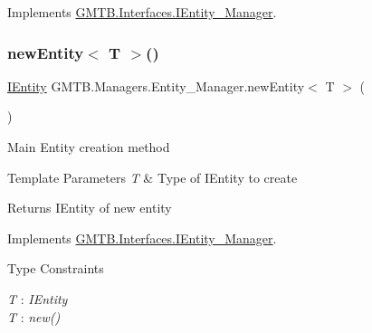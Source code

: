 Implements \mbox{\hyperlink{interface_g_m_t_b_1_1_interfaces_1_1_i_entity___manager}{G\+M\+T\+B.\+Interfaces.\+I\+Entity\+\_\+\+Manager}}.

\mbox{\label{class_g_m_t_b_1_1_managers_1_1_entity___manager_a996b960a3e3755a9e2a90501aa961715}} 
\subsubsection{\texorpdfstring{newEntity$<$ T $>$()}{newEntity< T >()}\hspace{0.1cm}{\footnotesize\ttfamily [1/5]}}
{\footnotesize\ttfamily \mbox{\hyperlink{interface_g_m_t_b_1_1_interfaces_1_1_i_entity}{I\+Entity}} G\+M\+T\+B.\+Managers.\+Entity\+\_\+\+Manager.\+new\+Entity$<$ T $>$ (\begin{DoxyParamCaption}{ }\end{DoxyParamCaption})}



Main Entity creation method 


\begin{DoxyTemplParams}{Template Parameters}
{\em T} & Type of I\+Entity to create \\
\hline
\end{DoxyTemplParams}
\begin{DoxyReturn}{Returns}
I\+Entity of new entity 
\end{DoxyReturn}


Implements \mbox{\hyperlink{interface_g_m_t_b_1_1_interfaces_1_1_i_entity___manager}{G\+M\+T\+B.\+Interfaces.\+I\+Entity\+\_\+\+Manager}}.

\begin{Desc}
\item[Type Constraints]\begin{description}
\item[{\em T} : {\em I\+Entity}]\item[{\em T} : {\em new()}]\end{description}
\end{Desc}
\mbox{\label{class_g_m_t_b_1_1_managers_1_1_entity___manager_a3898b03d89ea4b3c735866bbe81040b9}} 
